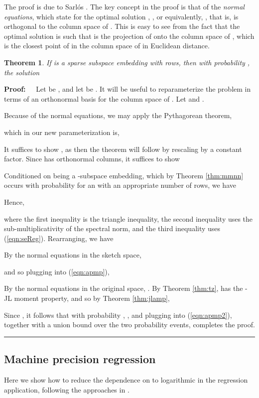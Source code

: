 \documentclass[11pt]{article}
\newtheorem{theorem}{Theorem}
\newenvironment{proof}{\begin{trivlist} \item {\bf Proof:~~}}
  {\qed\end{trivlist}}
\def\qed{\hfill\rule{2mm}{2mm}}
\begin{document}
The proof is due to Sarl\'{o}s \cite{S06}. The key concept in the proof is that of the {\it normal equations}, which state
for the optimal solution , , or equivalently, , that is,
 is orthogonal to the column space of . This is easy to see from the fact that the optimal
solution  is such that  is the projection of  onto the column space of , which is the closest
point of  in the column space of  in Euclidean distance. 

\begin{theorem}\label{thm:1eps}
If  is a sparse subspace embedding with  rows, then with probability , the solution

\end{theorem}
\begin{proof}
Let  be , and 
let  be . It will be useful to reparameterize the problem
in terms of an orthonormal basis  for the column space of . Let  and
. 

Because of the normal equations, we may apply the Pythagorean theorem,

which in our new parameterization is,

It suffices to show
, as then the theorem will follow by rescaling  by a constant 
factor. Since  has orthonormal columns, it suffices to show 

Conditioned on  being a  -subspace embedding,
which by Theorem \ref{thm:mmnn} occurs with probability  for an  with an appropriate  number
of rows, we have 


Hence,

where the first inequality is the triangle inequality, the second inequality uses the sub-multiplicativity of the spectral norm, 
and the third inequality uses (\ref{eqn:seReg}). Rearranging, we have

By the normal equations in the sketch space, 

and so plugging into (\ref{eqn:apmp}),

By the normal equations in the original space, .
By Theorem \ref{thm:tz},  has the -JL moment property, and so by Theorem \ref{thm:jlamp},

Since , it follows that with probability , 
, and plugging into (\ref{eqn:apmp2}),
together with a union bound over the two probability  events, completes the proof. 
\end{proof}

\subsection{Machine precision regression}\label{sec:machinePrecision}
Here we show how to reduce the dependence on  to logarithmic in the regression application, 
following the approaches in \cite{RT08,amt10,CW13}. 
\end{document}
